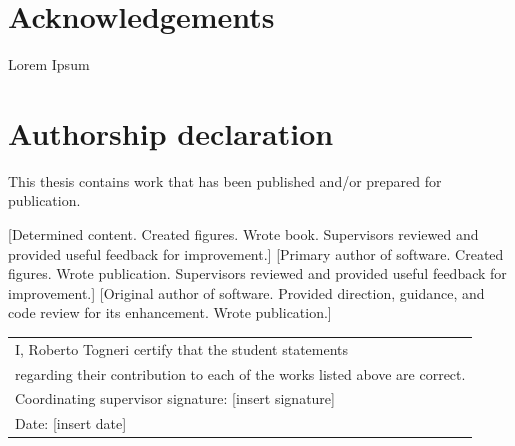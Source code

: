 \documentclass{book}
\begin{document}
\chapter*{Acknowledgements}
Lorem Ipsum 

\chapter*{Authorship declaration}



\begin{flushleft}
	This thesis contains work that has been published and/or prepared for publication.

	[Determined content. Created figures. Wrote book. Supervisors reviewed and provided useful feedback for improvement.]
	[Primary author of software. Created figures. Wrote publication. Supervisors reviewed and provided useful feedback for improvement.]
	[Original author of software. Provided direction, guidance, and code review for its enhancement. Wrote publication.]
	
	\vfill
	\vskip 0.5cm
	\begin{tabular}{l}
		I, Roberto Togneri certify that the student statements \\ regarding their contribution to each of the works listed above are correct. \\
		Coordinating supervisor signature: {[insert signature]}\\
		Date: {[insert date]}
	\end{tabular}
	\vspace{3cm}
\end{flushleft}
\end{document}
